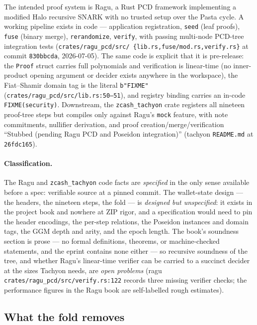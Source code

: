 \documentclass[11pt,a4paper]{article}
\theoremstyle{definition}
\begin{document}
The intended proof system is Ragu, a Rust PCD framework implementing a
modified Halo recursive SNARK with no trusted setup over the Pasta cycle. A
working pipeline exists in code --- application registration, \texttt{seed}
(leaf proofs), \texttt{fuse} (binary merge), \texttt{rerandomize},
\texttt{verify}, with passing multi-node PCD-tree integration tests
(\texttt{crates/\allowbreak ragu\_pcd/\allowbreak src/\allowbreak
\{lib.rs,\allowbreak fuse/mod.rs,\allowbreak verify.rs\}} at commit
\texttt{830bbcda}, 2026-07-05). The same code is explicit that it is
pre-release: the \texttt{Proof} struct carries full polynomials and
verification is linear-time (no inner-product opening argument or decider
exists anywhere in the workspace), the Fiat--Shamir domain tag is the
literal \texttt{b"FIXME"} (\texttt{crates/ragu\_pcd/src/lib.rs:50--51}), and
registry binding carries an in-code \texttt{FIXME(security)}. Downstream,
the \texttt{zcash\_tachyon} crate registers all nineteen proof-tree steps but
compiles only against Ragu's \texttt{mock} feature, with note commitments,
nullifier derivation, and proof creation/merge/verification ``Stubbed
(pending Ragu PCD and Poseidon integration)'' (tachyon \texttt{README.md} at
\texttt{26fdc165}).

\paragraph{Classification.} The Ragu and \texttt{zcash\_tachyon} code facts
are \emph{specified} in the only sense available before a spec: verifiable
source at a pinned commit. The wallet-state design --- the headers, the
nineteen steps, the fold --- is \emph{designed but unspecified}: it exists in
the project book and nowhere at ZIP rigor, and a specification would need to
pin the header encodings, the per-step relations, the Poseidon instances and
domain tags, the GGM depth and arity, and the epoch length. The book's
soundness section is prose --- no formal definitions, theorems, or
machine-checked statements, and the eprint contains none either --- so
recursive soundness of the tree, and whether Ragu's linear-time verifier can
be carried to a succinct decider at the sizes Tachyon needs, are \emph{open
problems} (ragu \texttt{crates/ragu\_pcd/src/verify.rs:122} records three
missing verifier checks; the performance figures in the Ragu book are
self-labelled rough estimates).

\subsection{What the fold removes}\label{sec:tachyon-removes}
\end{document}
